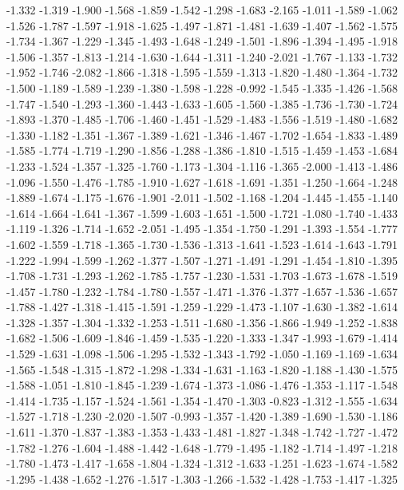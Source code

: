 \documentclass[9pt]{article}
\theoremstyle{plain}
\theoremstyle{definition}
\theoremstyle{remark}
\numberwithin{equation}{section}
\begin{document}
-1.332
-1.319
-1.900
-1.568
-1.859
-1.542
-1.298
-1.683
-2.165
-1.011
-1.589
-1.062
-1.526
-1.787
-1.597
-1.918
-1.625
-1.497
-1.871
-1.481
-1.639
-1.407
-1.562
-1.575
-1.734
-1.367
-1.229
-1.345
-1.493
-1.648
-1.249
-1.501
-1.896
-1.394
-1.495
-1.918
-1.506
-1.357
-1.813
-1.214
-1.630
-1.644
-1.311
-1.240
-2.021
-1.767
-1.133
-1.732
-1.952
-1.746
-2.082
-1.866
-1.318
-1.595
-1.559
-1.313
-1.820
-1.480
-1.364
-1.732
-1.500
-1.189
-1.589
-1.239
-1.380
-1.598
-1.228
-0.992
-1.545
-1.335
-1.426
-1.568
-1.747
-1.540
-1.293
-1.360
-1.443
-1.633
-1.605
-1.560
-1.385
-1.736
-1.730
-1.724
-1.893
-1.370
-1.485
-1.706
-1.460
-1.451
-1.529
-1.483
-1.556
-1.519
-1.480
-1.682
-1.330
-1.182
-1.351
-1.367
-1.389
-1.621
-1.346
-1.467
-1.702
-1.654
-1.833
-1.489
-1.585
-1.774
-1.719
-1.290
-1.856
-1.288
-1.386
-1.810
-1.515
-1.459
-1.453
-1.684
-1.233
-1.524
-1.357
-1.325
-1.760
-1.173
-1.304
-1.116
-1.365
-2.000
-1.413
-1.486
-1.096
-1.550
-1.476
-1.785
-1.910
-1.627
-1.618
-1.691
-1.351
-1.250
-1.664
-1.248
-1.889
-1.674
-1.175
-1.676
-1.901
-2.011
-1.502
-1.168
-1.204
-1.445
-1.455
-1.140
-1.614
-1.664
-1.641
-1.367
-1.599
-1.603
-1.651
-1.500
-1.721
-1.080
-1.740
-1.433
-1.119
-1.326
-1.714
-1.652
-2.051
-1.495
-1.354
-1.750
-1.291
-1.393
-1.554
-1.777
-1.602
-1.559
-1.718
-1.365
-1.730
-1.536
-1.313
-1.641
-1.523
-1.614
-1.643
-1.791
-1.222
-1.994
-1.599
-1.262
-1.377
-1.507
-1.271
-1.491
-1.291
-1.454
-1.810
-1.395
-1.708
-1.731
-1.293
-1.262
-1.785
-1.757
-1.230
-1.531
-1.703
-1.673
-1.678
-1.519
-1.457
-1.780
-1.232
-1.784
-1.780
-1.557
-1.471
-1.376
-1.377
-1.657
-1.536
-1.657
-1.788
-1.427
-1.318
-1.415
-1.591
-1.259
-1.229
-1.473
-1.107
-1.630
-1.382
-1.614
-1.328
-1.357
-1.304
-1.332
-1.253
-1.511
-1.680
-1.356
-1.866
-1.949
-1.252
-1.838
-1.682
-1.506
-1.609
-1.846
-1.459
-1.535
-1.220
-1.333
-1.347
-1.993
-1.679
-1.414
-1.529
-1.631
-1.098
-1.506
-1.295
-1.532
-1.343
-1.792
-1.050
-1.169
-1.169
-1.634
-1.565
-1.548
-1.315
-1.872
-1.298
-1.334
-1.631
-1.163
-1.820
-1.188
-1.430
-1.575
-1.588
-1.051
-1.810
-1.845
-1.239
-1.674
-1.373
-1.086
-1.476
-1.353
-1.117
-1.548
-1.414
-1.735
-1.157
-1.524
-1.561
-1.354
-1.470
-1.303
-0.823
-1.312
-1.555
-1.634
-1.527
-1.718
-1.230
-2.020
-1.507
-0.993
-1.357
-1.420
-1.389
-1.690
-1.530
-1.186
-1.611
-1.370
-1.837
-1.383
-1.353
-1.433
-1.481
-1.827
-1.348
-1.742
-1.727
-1.472
-1.782
-1.276
-1.604
-1.488
-1.442
-1.648
-1.779
-1.495
-1.182
-1.714
-1.497
-1.218
-1.780
-1.473
-1.417
-1.658
-1.804
-1.324
-1.312
-1.633
-1.251
-1.623
-1.674
-1.582
-1.295
-1.438
-1.652
-1.276
-1.517
-1.303
-1.266
-1.532
-1.428
-1.753
-1.417
-1.325
\end{document}
